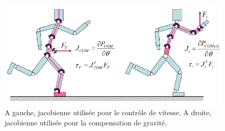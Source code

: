 \documentclass[runningheads,a4paper]{llncs}
\begin{document}
\label{sec:jacob}
\begin{figure}[h]
\centering
\includegraphics[scale=0.5]{shema_jacobians.png}
\caption{A gauche, jacobienne utilisée pour le contrôle de vitesse. A droite, jacobienne utilisée pour la compensation de gravité. \cite{coros2010generalized} }
\label{fig:jacob}
\end{figure}
\end{document}
